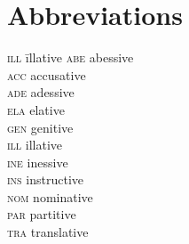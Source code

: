 \documentclass[output=paper, colorlinks,citecolor=brown]{langsci/langscibook}
\begin{document}
\section*{Abbreviations}
\begin{multicols}{4}
\begin{tabbing}
\textsc{ill} \hspace{1ex} \= illative\kill
\textsc{abe} \> abessive\\
\textsc{acc} \> accusative\\
\textsc{ade} \> adessive\\
\textsc{ela} \> elative\\
\textsc{gen} \> genitive\\
\textsc{ill} \> illative\\
\textsc{ine} \> inessive\\
\textsc{ins} \> instructive\\
\textsc{nom} \> nominative\\
\textsc{par} \> partitive\\
\textsc{tra} \> translative
\end{tabbing}
\end{multicols}


{\sloppy\printbibliography[heading=subbibliography,notkeyword=this]}
\end{document}
